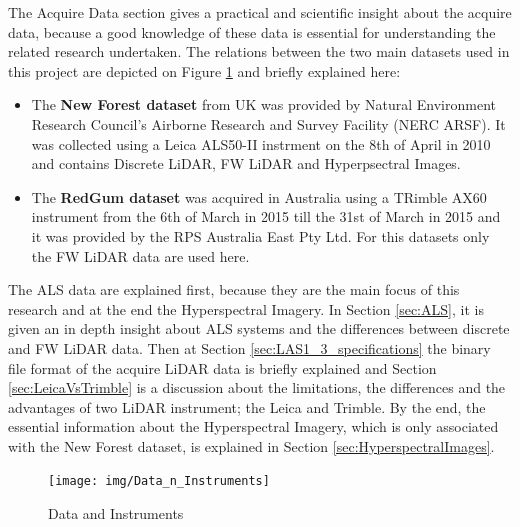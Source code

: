 \documentclass{subfiles}
\begin{document}
The Acquire Data section gives a practical and scientific insight about the acquire data, because  a good knowledge of these data is essential for understanding the related research undertaken. The relations between the two main datasets used in this project are depicted on Figure \ref{fig:dataInstrumentsRelations} and briefly explained here: 
\begin{itemize}
\item The \textbf{New Forest dataset} from UK was provided by Natural Environment Research Council’s Airborne Research and Survey Facility (NERC ARSF). It was collected using a Leica ALS50-II instrment on the 8th of April in 2010 and contains Discrete LiDAR, FW LiDAR and Hyperpsectral Images. 
\item The \textbf{RedGum dataset} was acquired in Australia using a TRimble AX60 instrument from the 6th of March in 2015 till the 31st of March in 2015 and it was provided by the RPS Australia East Pty Ltd. For this datasets only the FW LiDAR data are used here. 
\end{itemize}

The ALS data are explained first, because they are the main focus of this research and at the end the Hyperspectral Imagery. In Section \ref{sec:ALS}, it is given an in depth insight about ALS systems and the differences between discrete and FW LiDAR data. Then at Section \ref{sec:LAS1_3_specifications} the binary file format of the acquire LiDAR data is briefly explained and Section \ref{sec:LeicaVsTrimble} is a discussion about the limitations, the differences and the advantages of two LiDAR instrument; the Leica and Trimble. By the end, the essential information about the Hyperspectral Imagery, which is only associated with the New Forest dataset, is explained in Section \ref{sec:HyperspectralImages}. 


\begin{figure}[!htbp]
	\centering
	\texttt{[image: img/Data\_n\_Instruments]}
	\caption{Data and Instruments}
   	\label{fig:dataInstrumentsRelations}
\end{figure}
\end{document}
